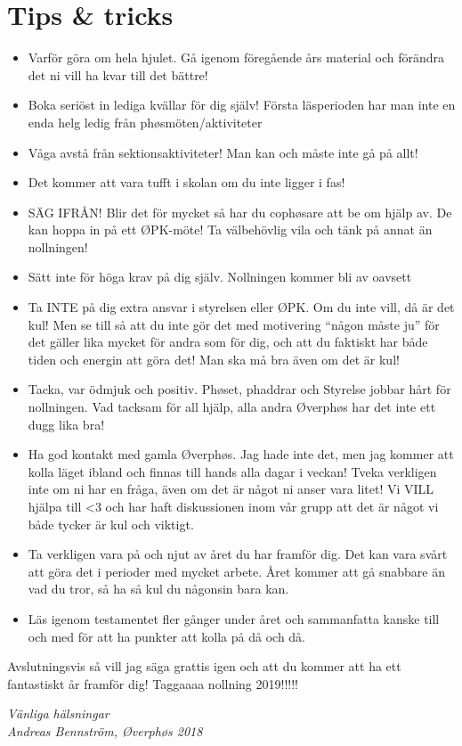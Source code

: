 \documentclass[10pt]{article}
\begin{document}
    \section{Tips \& tricks}
    \begin{itemize}
        \item Varför göra om hela hjulet. Gå igenom föregående års material och förändra det ni vill ha kvar till det bättre!
        \item Boka seriöst in lediga kvällar för dig själv! Första läsperioden har man inte en enda helg ledig från phøsmöten/aktiviteter
        \item Våga avstå från sektionsaktiviteter! Man kan och måste inte gå på allt! 
        \item Det kommer att vara tufft i skolan om du inte ligger i fas!
        \item SÄG IFRÅN! Blir det för mycket så har du cophøsare att be om hjälp av. De kan hoppa in på ett ØPK-möte! Ta välbehövlig vila och tänk på annat än nollningen!
        \item Sätt inte för höga krav på dig själv. Nollningen kommer bli av oavsett
        \item Ta INTE på dig extra ansvar i styrelsen eller ØPK. Om du inte vill, då är det kul! Men se till så att du inte gör det med motivering ``någon måste ju'' för det gäller lika mycket för andra som för dig, och att du faktiskt har både tiden och energin att göra det! Man ska må bra även om det är kul!
        \item Tacka, var ödmjuk och positiv. Phøset, phaddrar och Styrelse jobbar hårt för nollningen. Vad tacksam för all hjälp, alla andra Øverphøs har det inte ett dugg lika bra!
        \item Ha god kontakt med gamla Øverphøs. Jag hade inte det, men jag kommer att kolla läget ibland och finnas till hands alla dagar i veckan! Tveka verkligen inte om ni har en fråga, även om det är något ni anser vara litet! Vi VILL hjälpa till <3 och har haft diskussionen inom vår grupp att det är något vi både tycker är kul och viktigt.
        \item Ta verkligen vara på och njut av året du har framför dig. Det kan vara svårt att göra det i perioder med mycket arbete. Året kommer att gå snabbare än vad du tror, så ha så kul du någonsin bara kan.
        \item Läs igenom testamentet fler gånger under året och sammanfatta kanske till och med för att ha punkter att kolla på då och då.      
    \end{itemize}

    Avslutningsvis så vill jag säga grattis igen och att du kommer att ha ett fantastiskt år framför dig! Taggaaaa nollning 2019!!!!!

    \emph{Vänliga hälsningar}\\
    \emph{Andreas Bennström, Øverphøs 2018}
\end{document}
